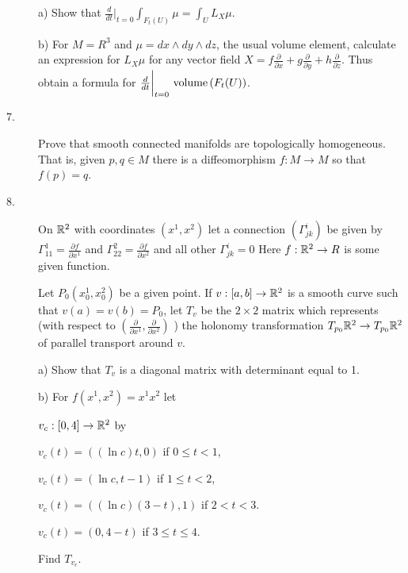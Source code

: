 \documentclass[bbb]{report}
\def\ds{\displaystyle}
\def\R{{\Bbb R}}
\begin{document}
\begin{large}
\begin{description}
\item[\quad] a) Show that
$\ds\frac{d}{dt}\bigg|_{t=0}\ds\int_{F_t(U)} \mu=\ds\int_UL_X\mu$.

\item[\quad] b) For $M=R^3$ and $\mu=dx\wedge dy\wedge dz$,
the usual volume element, calculate an expression for $L_X\mu$ for
any vector field
$X=f\frac{\partial}{\partial x}
  +g\frac{\partial}{\partial y}
  +h\frac{\partial}{\partial z}$.
Thus obtain a formula for
$\frac{d}{dt}\bigg|_{t=0}\ \hbox{volume}\,(F_t(U))$.

\vspace{.25in}
\item[7.]
Prove that smooth connected manifolds are topologically homogeneous.
That is, given $p, q\in M$ there is a diffeomorphism
$f:M\to M$ so that $f(p)=q$.

\vspace{.25in}
\item[8.]
On $\R^2$ with coordinates $(x^1,x^2)$ let a connection
$(\Gamma^i_{jk})$ be given by $\Gamma^1_{11}=\frac{\partial f}{\partial x^1}$
and $\Gamma^2_{22}=\frac{\partial f}{\partial x^2}$ and all other
$\Gamma^i_{j k}=0$
Here $f:\R^2\to R$ is some given function.

Let $P_0(x^1_0, x^2_0)$ be a given point. If
$v:[a,b]\to \R^2$ is a smooth curve such that
$v(a)=v(b)=P_0$, let $T_v$ be the $2\times 2$ matrix
which represents (with respect to
$\left(\frac{\partial}{\partial x^1},\frac{\partial}{\partial x^2}\right)$ )
the holonomy transformation $T_{p_0}\R^2\to T_{p_0}\R^2$
of parallel transport around $v$.

\item[\quad] a) Show that $T_v$ is a diagonal matrix
  with determinant equal to 1.

\item[\quad] b) For $f(x^1,x^2)=x^1x^2$
let

$v_c:[0,4]\to \R^2$ by

$v_c(t)=((\ln c)t,0)$ if $0\leq t<1$,

$v_c(t)=(\ln c, t-1)$ if $1\leq t<2$,

$v_c(t)=((\ln c)(3-t),1)$ if $2<t<3$.

$v_c(t)=(0,4-t)$ if $3\leq t\leq 4$.

Find $T_{v_c}$.


\vfill
\clearpage


\end{description}
\end{large}
\end{document}
